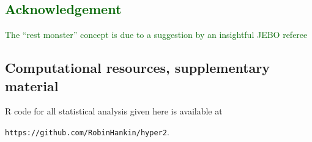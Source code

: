 \documentclass[review]{elsarticle}
\begin{document}
\subsection*{\textcolor{DarkGreen}{Acknowledgement}}

\textcolor{DarkGreen}{The ``rest monster'' concept is due to a
  suggestion by an insightful JEBO referee}

\subsection*{Computational resources, supplementary material}

R code for all statistical analysis given here is available at

{\tt https://github.com/RobinHankin/hyper2}.


\end{document}
